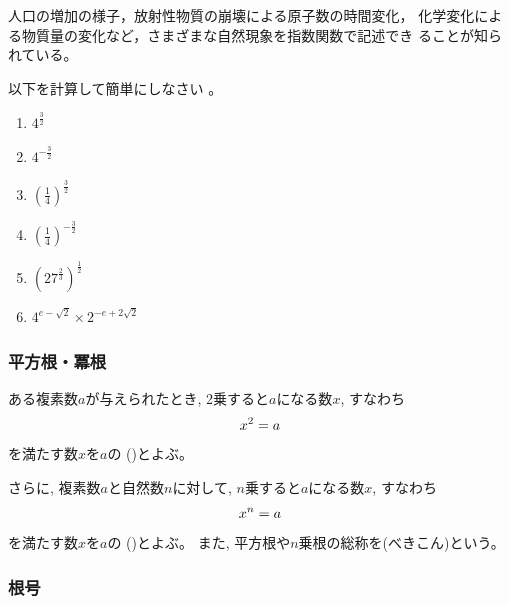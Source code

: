 \documentclass[twocolumn,11pt]{jarticle}
\begin{document}
人口の増加の様子，放射性物質の崩壊による原子数の時間変化，
化学変化による物質量の変化など，さまざまな自然現象を指数関数で記述でき
ることが知られている。

\exercise
以下を計算して簡単にしなさい
。
\begin{enumerate}
\item\label{item:4^(3/2)} $\displaystyle 4^\frac{3}{2}$
\item\label{item:4^(-3/2)} $\displaystyle 4^{-\frac{3}{2}}$
\item\label{item:(1/4)^(3/2)} $\displaystyle\left(\frac{1}{4}\right)^{\frac{3}{2}}$
\item\label{item:(1/4)^(-3/2)} $\displaystyle\left(\frac{1}{4}\right)^{-\frac{3}{2}}$
\item\label{item:27^(2/3)^(1/2)} $\displaystyle\left(27^{\frac{2}{3}}\right)^{\frac{1}{2}}$
\item\label{item:4^(e-sqrt2)/2^(-e+sqrt2)} $4^{e-\sqrt{2}}\times 2^{-e+2\sqrt{2}}$
\end{enumerate}

\subsubsection{平方根・冪根}

ある複素数$a$が与えられたとき, 2乗すると$a$になる数$x$, すなわち
\begin{align}
x^2=a\notag
\end{align}
を満たす数$x$を$a$の
()とよぶ。

さらに, 複素数$a$と自然数$n$に対して, $n$乗すると$a$になる数$x$, すなわち
\begin{align}
x^n=a\notag
\end{align}
を満たす数$x$を$a$の
()とよぶ。
また, 平方根や$n$乗根の総称を(べきこん)という。

\subsubsection{根号}
\end{document}
